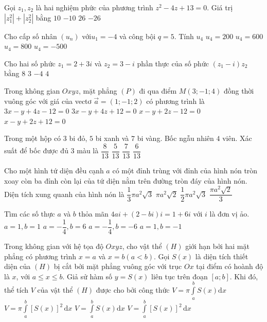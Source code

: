 \begin{ex}%
Gọi $z_1, z_2$ là hai nghiệm phức của phương trình $ z^2-4 z+13=0 $. Giá trị $ \left|z_1^2\right|+\left|z_2^2\right| $ bằng
\choice
{$10$}
{$ -10 $}
{\True $26$}
{$ -26 $}

\end{ex}
\begin{ex}%
Cho cấp số nhân $\left(u_n\right)$ với$ u_1=-4 $ và công bội $ q=5 $. Tính $ u_4 $
\choice
{$ u_4=200 $}
{$ u_4=600 $}
{$ u_4=800 $}
{\True $ u_4=-500 $}

\end{ex}
\begin{ex}%
Cho hai số phức $ z_1=2+3 i $ và $ z_2=3-i $ phần thực của số phức $ \left(z_1-i\right) z_2 $ bằng
\choice
{\True $8$}
{$3$}
{$-4$}
{$4$}

\end{ex}

\begin{ex}%
Trong không gian $O x y z$, mặt phẳng $(P)$ đi qua điểm $ M(3;-1; 4) $ đồng thời vuông góc với giá của vectơ $ \vec{a}=(1;-1; 2) $ có phương trình là
\choice
{$ 3 x-y+4 z-12=0 $}
{$ 3 x-y+4 z+12=0 $}
{$ x-y+2 z-12=0 $}
{\True $ x-y+2 z+12=0 $}

\end{ex}
\begin{ex}%
Trong một hộp có $3$ bi đỏ, $5$ bi xanh và $7$ bi vàng. Bốc ngẫu nhiên $4$ viên. Xác suất để bốc được đủ $3$ màu là
\choice
{$ \dfrac{8}{13} $}
{$ \dfrac{5}{13} $}
{$ \dfrac{7}{13} $}
{\True $ \dfrac{6}{13} $}

\end{ex}
\begin{ex}%
Cho một hình tứ diện đều cạnh $ a $ có một đỉnh trùng với đỉnh của hình nón tròn xoay còn ba đỉnh còn lại của tứ diện nằm trên đường tròn đáy của hình nón. Diện tích xung quanh của hình nón là
\choice
{\True $ \dfrac{1}{3} \pi a^2 \sqrt{3} $}
{$ \pi a^2 \sqrt{2} $}
{$ \dfrac{1}{2} \pi a^2 \sqrt{3} $}
{$ \dfrac{\pi a^2 \sqrt{2}}{3} $}

\end{ex}
\begin{ex}%
Tìm các số thực $ a $ và $ b $ thỏa mãn $ 4 a i+(2-b i) i=1+6 i $ với $ i $ là đơn vị ảo.
\choice
{\True $ a=1, b=1 $}
{$ a=-\dfrac{1}{4}, b=6 $}
{$ a=-\dfrac{1}{4}, b=-6 $}
{$ a=1, b=-1 $}

\end{ex}
\begin{ex}%
Trong không gian với hệ tọa độ $O x y z$, cho vật thể $ (H) $ giới hạn bởi hai mặt phẳng có phương trình $ x=a $ và $ x=b(a<b) $. Gọi $ S(x) $ là diện tích thiết diện của $ (H) $ bị cắt bởi mặt phẳng vuông góc với trục $ O x $ tại điểm có hoành độ là $x$, với $ a \leq x \leq b $. Giả sử hàm số $ y=S(x) $ liên tục trên đoạn $ [a; b] $. Khi đó, thể tích $ V $ của vật thể $ (H) $ được cho bởi công thức
\choice
{$ V=\pi \displaystyle\int\limits_a^{b} S(x) \mathrm{d} x $}
{$ V=\pi \displaystyle\int\limits_a^{b}[S(x)]^2 \mathrm{\,d} x $}
{\True $ V=\displaystyle\int\limits_a^{b} S(x) \mathrm{d} x $}
{$ V=\displaystyle\int\limits_a^{b}[S(x)]^2 \mathrm{\,d} x $}

\end{ex}


